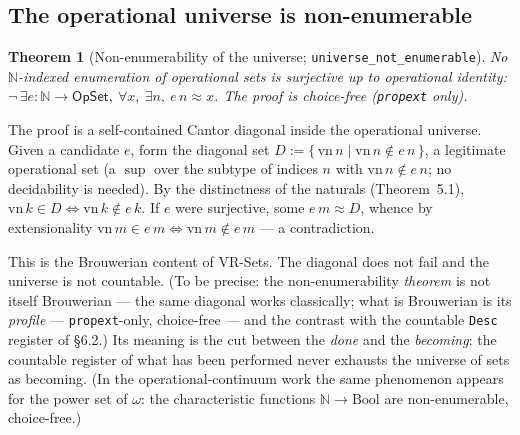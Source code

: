 \documentclass[11pt]{article}
\newtheorem{thm}{Theorem}[section]
\theoremstyle{remark}
\newcommand{\OpSet}{\textsf{OpSet}}
\newcommand{\eq}{\approx}
\newcommand{\N}{\mathbb{N}}
\begin{document}
\subsection{The operational universe is non-enumerable}
\begin{thm}[Non-enumerability of the universe; \texttt{universe\_not\_enumerable}]
No $\N$-indexed enumeration of operational sets is surjective up to operational identity:
$\neg\,\exists e:\N\to\OpSet,\ \forall x,\ \exists n,\ e\,n\eq x$. The proof is choice-free
(\texttt{propext} only).
\end{thm}
The proof is a self-contained Cantor diagonal inside the operational universe. Given a candidate $e$,
form the diagonal set $D:=\{\,\mathrm{vn}\,n\mid \mathrm{vn}\,n\notin e\,n\,\}$, a legitimate
operational set (a $\sup$ over the subtype of indices $n$ with $\mathrm{vn}\,n\notin e\,n$; no
decidability is needed). By the distinctness of the naturals (Theorem~5.1),
$\mathrm{vn}\,k\in D\iff\mathrm{vn}\,k\notin e\,k$. If $e$ were surjective, some $e\,m\eq D$, whence
by extensionality $\mathrm{vn}\,m\in e\,m\iff\mathrm{vn}\,m\notin e\,m$ --- a contradiction.

This is the Brouwerian content of VR-Sets. The diagonal does not fail and the universe is not
countable. (To be precise: the non-enumerability \emph{theorem} is not itself Brouwerian --- the same
diagonal works classically; what is Brouwerian is its \emph{profile} --- \texttt{propext}-only,
choice-free --- and the contrast with the countable \texttt{Desc} register of \S6.2.) Its meaning is the cut between the \emph{done} and the \emph{becoming}: the countable
register of what has been performed never exhausts the universe of sets as becoming. (In the
operational-continuum work the same phenomenon appears for the power set of $\omega$: the
characteristic functions $\N\to\mathrm{Bool}$ are non-enumerable, choice-free.)
\end{document}
